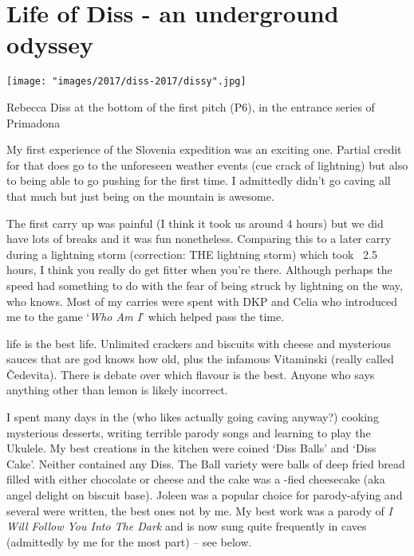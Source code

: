 \section{Life of Diss - an underground odyssey}



\begin{marginfigure} \centering
\texttt{[image: "images/2017/diss-2017/dissy".jpg]}
\caption{Rebecca Diss at the bottom of the first pitch (P6), in the entrance series of Primadona }
\end{marginfigure}

My first experience of the Slovenia expedition was an exciting one. Partial credit for that does go to the unforeseen weather events (cue crack of lightning) but also to being able to go pushing for the first time. I admittedly didn't go caving all that much but just being on the mountain is awesome.
 
The first carry up  was painful (I think it took us around 4 hours) but we did have lots of breaks and it was fun nonetheless. Comparing this to a later carry during a lightning storm (correction: THE lightning storm) which took ~2.5 hours, I think you really do get fitter when you're there. Although perhaps the speed had something to do with the fear of being struck by lightning on the way, who knows. Most of my carries were spent with DKP and Celia who introduced me to the game `\textit{Who Am I}' which helped pass the time.

 life is the best life. Unlimited crackers and biscuits with cheese and mysterious sauces that are god knows how old, plus the infamous Vitaminski (really called \v{C}edevita). There is debate over which flavour is the best. Anyone who says anything other than lemon is likely incorrect.



I spent many days in the  (who likes actually going caving anyway?) cooking mysterious desserts, writing terrible parody songs and learning to play the Ukulele. My best creations in the  kitchen were coined `Diss Balls' and `Diss Cake'. Neither contained any Diss. The Ball variety were balls of deep fried bread filled with either chocolate or cheese and the cake was a -fied cheesecake (aka angel delight on biscuit base). Joleen was a popular choice for parody-afying and several were written, the best ones not by me. My best work was a parody of \emph{I Will Follow You Into The Dark} and is now sung quite frequently in caves (admittedly by me for the most part) – see below.

